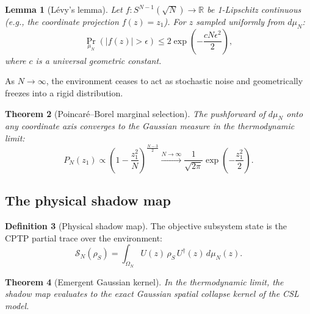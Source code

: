 \documentclass[aps,prd,twocolumn,superscriptaddress,nofootinbib]{revtex4-2}
\newtheorem{theorem}{Theorem}[section]
\newtheorem{lemma}[theorem]{Lemma}
\theoremstyle{definition}
\newtheorem{definition}[theorem]{Definition}
\theoremstyle{remark}
\newcommand{\R}{\mathbb{R}}
\newcommand{\SN}{\mathcal{S}_N}
\begin{document}
\begin{lemma}[L\'evy's lemma]
\label{lem:levy}
Let $f : S^{N-1}(\sqrt{N}) \to \R$ be 1-Lipschitz continuous (e.g., the
coordinate projection $f(z) = z_1$). For $z$ sampled uniformly from
$d\mu_N$:
\begin{equation}
\Pr_{\mu_N}(|f(z)| > \epsilon) \leq 2 \exp\!\left(
-\frac{c N \epsilon^2}{2}\right),
\label{eq:levy}
\end{equation}
where $c$ is a universal geometric constant.
\end{lemma}

As $N \to \infty$, the environment ceases to act as stochastic noise and
geometrically freezes into a rigid distribution.

\begin{theorem}[Poincar\'e--Borel marginal selection]
\label{thm:poincare_borel}
The pushforward of $d\mu_N$ onto any coordinate axis converges to the
Gaussian measure in the thermodynamic limit:
\begin{equation}
P_N(z_1) \propto \left(1 - \frac{z_1^2}{N}\right)^{\!\frac{N-3}{2}}
\xrightarrow{N \to \infty}
\frac{1}{\sqrt{2\pi}} \exp\!\left(-\frac{z_1^2}{2}\right).
\label{eq:poincare_borel}
\end{equation}
\end{theorem}

\subsection{The physical shadow map}

\begin{definition}[Physical shadow map]
\label{def:shadow_map}
The objective subsystem state is the CPTP partial trace over the
environment:
\begin{equation}
\SN(\rho_S) = \int_{\Omega_N} U(z)\, \rho_S\, U^\dagger(z)\, d\mu_N(z).
\label{eq:shadow_map}
\end{equation}
\end{definition}

\begin{theorem}[Emergent Gaussian kernel]
\label{thm:gaussian_kernel}
In the thermodynamic limit, the shadow map evaluates to the exact Gaussian
spatial collapse kernel of the CSL model.
\end{theorem}
\end{document}
